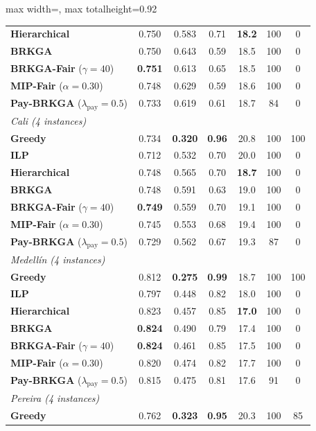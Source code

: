 \documentclass[a4paper,11pt,review,3p,authoryear]{elsarticle}
\newlength{\portraitwidth}\AtBeginDocument{\setlength{\portraitwidth}{\textwidth}} %
\begin{document}
\begin{table}
\begin{adjustbox}{max width=\textheight, max totalheight=0.92\portraitwidth}
\begin{tabular}{l|c|c|c|c|c|c}
\textbf{Hierarchical} & 0.750 & 0.583 & 0.71 & \textbf{18.2} & 100 & 0 \\
\textbf{BRKGA} & 0.750 & 0.643 & 0.59 & 18.5 & 100 & 0 \\
\textbf{BRKGA-Fair} ($\gamma = 40$) & \textbf{0.751} & 0.613 & 0.65 & 18.5 & 100 & 0 \\
\textbf{MIP-Fair} ($\alpha = 0.30$) & 0.748 & 0.629 & 0.59 & 18.6 & 100 & 0 \\
\textbf{Pay-BRKGA} ($\lambda_{\text{pay}} = 0.5$) & 0.733 & 0.619 & 0.61 & 18.7 & 84 & 0 \\
\hline
\multicolumn{7}{l}{\textit{Cali (4 instances)}} \\
\textbf{Greedy} & 0.734 & \textbf{0.320} & \textbf{0.96} & 20.8 & 100 & 100 \\
\textbf{ILP} & 0.712 & 0.532 & 0.70 & 20.0 & 100 & 0 \\
\textbf{Hierarchical} & 0.748 & 0.565 & 0.70 & \textbf{18.7} & 100 & 0 \\
\textbf{BRKGA} & 0.748 & 0.591 & 0.63 & 19.0 & 100 & 0 \\
\textbf{BRKGA-Fair} ($\gamma = 40$) & \textbf{0.749} & 0.559 & 0.70 & 19.1 & 100 & 0 \\
\textbf{MIP-Fair} ($\alpha = 0.30$) & 0.745 & 0.553 & 0.68 & 19.4 & 100 & 0 \\
\textbf{Pay-BRKGA} ($\lambda_{\text{pay}} = 0.5$) & 0.729 & 0.562 & 0.67 & 19.3 & 87 & 0 \\
\hline
\multicolumn{7}{l}{\textit{Medell\'in (4 instances)}} \\
\textbf{Greedy} & 0.812 & \textbf{0.275} & \textbf{0.99} & 18.7 & 100 & 100 \\
\textbf{ILP} & 0.797 & 0.448 & 0.82 & 18.0 & 100 & 0 \\
\textbf{Hierarchical} & 0.823 & 0.457 & 0.85 & \textbf{17.0} & 100 & 0 \\
\textbf{BRKGA} & \textbf{0.824} & 0.490 & 0.79 & 17.4 & 100 & 0 \\
\textbf{BRKGA-Fair} ($\gamma = 40$) & \textbf{0.824} & 0.461 & 0.85 & 17.5 & 100 & 0 \\
\textbf{MIP-Fair} ($\alpha = 0.30$) & 0.820 & 0.474 & 0.82 & 17.7 & 100 & 0 \\
\textbf{Pay-BRKGA} ($\lambda_{\text{pay}} = 0.5$) & 0.815 & 0.475 & 0.81 & 17.6 & 91 & 0 \\
\hline
\multicolumn{7}{l}{\textit{Pereira (4 instances)}} \\
\textbf{Greedy} & 0.762 & \textbf{0.323} & \textbf{0.95} & 20.3 & 100 & 85 \\

\end{tabular}
\end{adjustbox}
\end{table}
\end{document}
